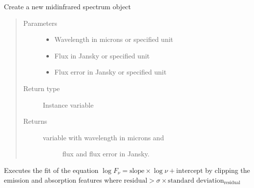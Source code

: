\documentclass[letterpaper,10pt,english]{sphinxmanual}
\begin{document}
\begin{fulllineitems}
\label{\detokenize{LINFIT:mirspec.mirspec}}
\pysigstartsignatures
{}
\pysigstopsignatures
\sphinxAtStartPar
Create a new mid\sphinxhyphen{}infrared spectrum object
\begin{quote}\begin{description}
\item[{Parameters}] \leavevmode\begin{itemize}
\item {} 
\sphinxAtStartPar
{} \textendash{} Wavelength in microns  or specified unit

\item {} 
\sphinxAtStartPar
{} \textendash{} Flux in Jansky or specified unit

\item {} 
\sphinxAtStartPar
{} \textendash{} Flux error in Jansky  or specified unit

\end{itemize}

\item[{Return type}] \leavevmode
\sphinxAtStartPar
Instance variable

\item[{Returns}] \leavevmode
\sphinxAtStartPar
\begin{description}
\item[{ variable with wavelength in microns and}] \leavevmode
\sphinxAtStartPar
flux and flux error in Jansky.

\end{description}


\end{description}\end{quote}

\begin{fulllineitems}
\label{\detokenize{LINFIT:mirspec.mirspec.linfit}}
\pysigstartsignatures
{}
\pysigstopsignatures
\sphinxAtStartPar
Executes the fit of the equation
\(\log F_\nu = \text{slope}\times\log\nu + \text{intercept}\)
by clipping the emission and absorption features where
\(\text{residual} > \sigma\times\text{standard deviation}_\text{residual}\)


\end{fulllineitems}
\end{fulllineitems}
\end{document}
